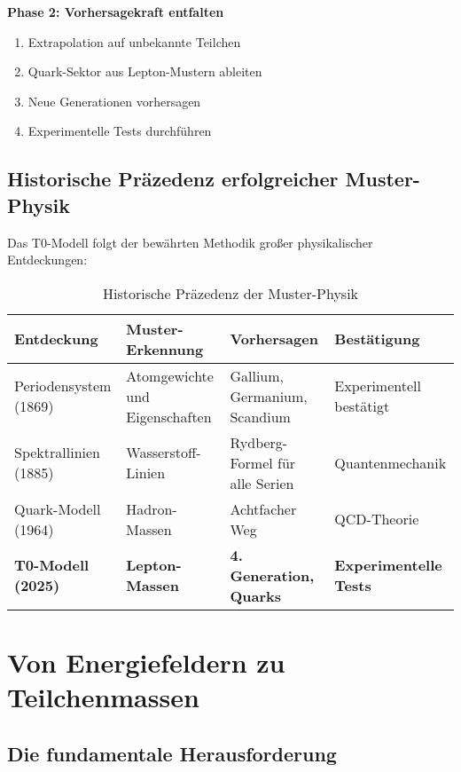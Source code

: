 \documentclass[12pt,a4paper]{article}
\begin{document}
	\textbf{Phase 2: Vorhersagekraft entfalten}
	\begin{enumerate}
		\item Extrapolation auf unbekannte Teilchen
		\item Quark-Sektor aus Lepton-Mustern ableiten
		\item Neue Generationen vorhersagen
		\item Experimentelle Tests durchführen
	\end{enumerate}
	
	\subsection{Historische Präzedenz erfolgreicher Muster-Physik}
	\label{subsec:historische_praezedenz}
	
	Das T0-Modell folgt der bewährten Methodik großer physikalischer Entdeckungen:
	
	\begin{table}[H]
		\centering
		\begin{tabular}{p{3cm}p{4cm}p{4cm}p{3cm}}
			\toprule
			\textbf{Entdeckung} & \textbf{Muster-Erkennung} & \textbf{Vorhersagen} & \textbf{Bestätigung} \\
			\midrule
			Periodensystem (1869) & Atomgewichte und Eigenschaften & Gallium, Germanium, Scandium & Experimentell bestätigt \\
			Spektrallinien (1885) & Wasserstoff-Linien & Rydberg-Formel für alle Serien & Quantenmechanik \\
			Quark-Modell (1964) & Hadron-Massen & Achtfacher Weg & QCD-Theorie \\
			\textbf{T0-Modell (2025)} & \textbf{Lepton-Massen} & \textbf{4. Generation, Quarks} & \textbf{Experimentelle Tests} \\
			\bottomrule
		\end{tabular}
		\caption{Historische Präzedenz der Muster-Physik}
		\label{tab:historische_praezedenz}
	\end{table}
	
	\section{Von Energiefeldern zu Teilchenmassen}
	\label{sec:energy_fields_to_masses}
	
	\subsection{Die fundamentale Herausforderung}
	\label{subsec:fundamental_challenge}
	
\end{document}
